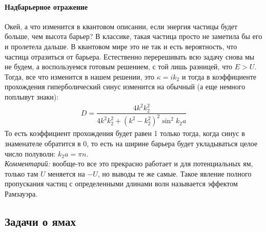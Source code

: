 \documentclass[12pt]{article}
\begin{document}
\paragraph{Надбарьерное отражение}
Окей, а что изменится в квантовом описании, если энергия частицы будет больше, чем высота барьер? В классике, такая частица просто не заметила бы его и пролетела дальше. В квантовом мире это не так и есть вероятность, что частица отразиться от барьера. Естественно перерешивать всю задачу снова мы не будем, а воспользуемся готовым решением, с той лишь разницей, что $E>U$. Тогда, все что изменится в нашем решении, это $\kappa = ik_2$ и тогда в коэффициенте прохождения гиперболический синус изменится на обычный (а еще немного поплывут знаки):
\begin{gather*}
        D =  \dfrac{4k^2k_2^2}{4k^2k_2^2 + (k^2-k_2^2)^2 \sin^2{k_2 a}} 
\end{gather*}
То есть коэффициент прохождения будет равен 1 только тогда, когда синус в знаменателе обратится в 0, то есть на ширине барьера будет укладываться целое число полуволн: $k_2 a = \pi n$. \\
\textit{Комментарий:} вообще-то все это прекрасно работает и для потенциальных ям, только там $U$ меняется на $-U$, но выводы те же самые. Такое явление полного пропускания частиц с определенными длинами волн называется эффектом Рамзауэра.
\subsection{Задачи о ямах}
\end{document}
